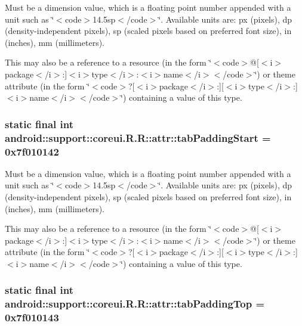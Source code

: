Must be a dimension value, which is a floating point number appended with a unit such as \char`\"{}$<$code$>$14.5sp$<$/code$>$\char`\"{}. Available units are: px (pixels), dp (density-independent pixels), sp (scaled pixels based on preferred font size), in (inches), mm (millimeters). 

This may also be a reference to a resource (in the form \char`\"{}$<$code$>$@\mbox{[}$<$i$>$package$<$/i$>$:\mbox{]}$<$i$>$type$<$/i$>$:$<$i$>$name$<$/i$>$$<$/code$>$\char`\"{}) or theme attribute (in the form \char`\"{}$<$code$>$?\mbox{[}$<$i$>$package$<$/i$>$:\mbox{]}\mbox{[}$<$i$>$type$<$/i$>$:\mbox{]}$<$i$>$name$<$/i$>$$<$/code$>$\char`\"{}) containing a value of this type. \hypertarget{classandroid_1_1support_1_1coreui_1_1_r_1_1attr_91177153594b9083a4367710fed4c122}{
\subsubsection[{tabPaddingStart}]{\setlength{\rightskip}{0pt plus 5cm}static final int android::support::coreui.R.R::attr::tabPaddingStart = 0x7f010142}}
\label{classandroid_1_1support_1_1coreui_1_1_r_1_1attr_91177153594b9083a4367710fed4c122}


Must be a dimension value, which is a floating point number appended with a unit such as \char`\"{}$<$code$>$14.5sp$<$/code$>$\char`\"{}. Available units are: px (pixels), dp (density-independent pixels), sp (scaled pixels based on preferred font size), in (inches), mm (millimeters). 

This may also be a reference to a resource (in the form \char`\"{}$<$code$>$@\mbox{[}$<$i$>$package$<$/i$>$:\mbox{]}$<$i$>$type$<$/i$>$:$<$i$>$name$<$/i$>$$<$/code$>$\char`\"{}) or theme attribute (in the form \char`\"{}$<$code$>$?\mbox{[}$<$i$>$package$<$/i$>$:\mbox{]}\mbox{[}$<$i$>$type$<$/i$>$:\mbox{]}$<$i$>$name$<$/i$>$$<$/code$>$\char`\"{}) containing a value of this type. \hypertarget{classandroid_1_1support_1_1coreui_1_1_r_1_1attr_cbe945e57cedd47c17f2d091440361f0}{
\subsubsection[{tabPaddingTop}]{\setlength{\rightskip}{0pt plus 5cm}static final int android::support::coreui.R.R::attr::tabPaddingTop = 0x7f010143}}
\label{classandroid_1_1support_1_1coreui_1_1_r_1_1attr_cbe945e57cedd47c17f2d091440361f0}



